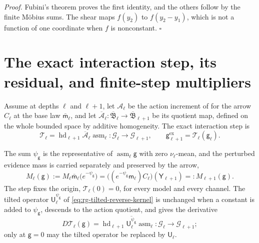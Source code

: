 \noindent\emph{Proof.}
Fubini's theorem proves the first identity, and the others follow by the finite
M\"obius sums. The shear maps $f(y_2)$ to $f(y_2-y_1)$, which is not a function of
one coordinate when $f$ is nonconstant. $\square$

\section{The exact interaction step, its residual, and finite-step multipliers}
\label{sec:rg-exact-nonlinear-interaction-rg}

Assume  at depths $\ell$ and $\ell+1$, let
$\mathcal A_\ell$ be the action increment of 
for the arrow $C_\ell$ at the base law $\bar{\mathsf m}_\ell$, and let
$\overline{\mathcal A}_\ell:\overline{\mathfrak B}_\ell\to\overline{\mathfrak
B}_{\ell+1}$ be its quotient map, defined on the whole bounded space by additive
homogeneity. The exact interaction step is
\begin{equation}
\mathcal T_\ell=\operatorname{hd}_{\ell+1}\overline{\mathcal A}_\ell\operatorname{asm}_\ell:
\mathcal G_\ell\longrightarrow\mathcal G_{\ell+1},
\qquad
\mathsf g^{\mathrm{ex}}_{\ell+1}=\mathcal T_\ell(\mathsf g_\ell).
\label{eq:rg-exact-nonlinear-interaction-map}
\end{equation}

The sum $\psi_{\mathsf g}$ is the representative of
$\operatorname{asm}_\ell\mathsf g$ with zero $\nu_\ell$-mean, and the perturbed
evidence mass is carried separately and preserved by the arrow,
\begin{equation}
M_\ell(\mathsf g):=M_\ell\bar{\mathsf m}_\ell\bigl(e^{-\psi_{\mathsf g}}\bigr)
=\bigl((e^{-\psi_{\mathsf g}}\mathsf m_\ell)C_\ell\bigr)(\mathsf Y_{\ell+1})
=:M_{\ell+1}(\mathsf g).
\label{eq:rg-interaction-evidence-mass}
\end{equation}
The step fixes the origin, $\mathcal T_\ell(0)=0$, for every model and every
channel. The tilted operator $\mathsf U_\ell^{\psi_{\mathsf g}}$ of
\eqref{eq:rg-tilted-reverse-kernel} is unchanged when a constant is added to
$\psi_{\mathsf g}$, descends to the action quotient, and gives the derivative
\begin{equation}
D\mathcal T_\ell(\mathsf g)
=\operatorname{hd}_{\ell+1}\overline{\mathsf U_\ell^{\psi_{\mathsf g}}}\operatorname{asm}_\ell:
\mathcal G_\ell\longrightarrow\mathcal G_{\ell+1};
\label{eq:rg-nonlinear-interaction-derivative}
\end{equation}
only at $\mathsf g=0$ may the tilted operator be replaced by $\mathsf U_\ell$.

